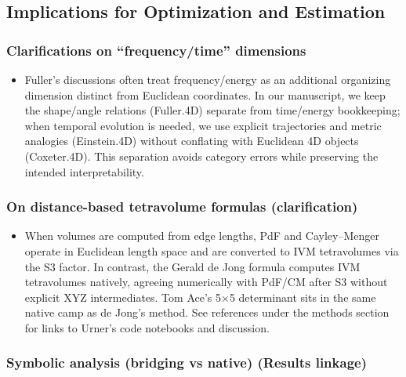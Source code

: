\documentclass[
  10pt,
]{article}
\providecommand{\tightlist}{%
  \setlength{\itemsep}{0pt}\setlength{\parskip}{0pt}}
\begin{document}
\hypertarget{implications-for-optimization-and-estimation}{%
\subsection{Implications for Optimization and
Estimation}\label{implications-for-optimization-and-estimation}}

\hypertarget{clarifications-on-frequencytime-dimensions}{%
\subsubsection{Clarifications on ``frequency/time''
dimensions}\label{clarifications-on-frequencytime-dimensions}}

\begin{itemize}
\tightlist
\item
  Fuller's discussions often treat frequency/energy as an additional
  organizing dimension distinct from Euclidean coordinates. In our
  manuscript, we keep the shape/angle relations (Fuller.4D) separate
  from time/energy bookkeeping; when temporal evolution is needed, we
  use explicit trajectories and metric analogies (Einstein.4D) without
  conflating with Euclidean 4D objects (Coxeter.4D). This separation
  avoids category errors while preserving the intended interpretability.
\end{itemize}

\hypertarget{on-distance-based-tetravolume-formulas-clarification}{%
\subsubsection{On distance-based tetravolume formulas
(clarification)}\label{on-distance-based-tetravolume-formulas-clarification}}

\begin{itemize}
\tightlist
\item
  When volumes are computed from edge lengths, PdF and Cayley--Menger
  operate in Euclidean length space and are converted to IVM
  tetravolumes via the S3 factor. In contrast, the Gerald de Jong
  formula computes IVM tetravolumes natively, agreeing numerically with
  PdF/CM after S3 without explicit XYZ intermediates. Tom Ace's 5×5
  determinant sits in the same native camp as de Jong's method. See
  references under the methods section for links to Urner's code
  notebooks and discussion.
\end{itemize}

\hypertarget{symbolic-analysis-bridging-vs-native-results-linkage}{%
\subsubsection{Symbolic analysis (bridging vs native) (Results
linkage)}\label{symbolic-analysis-bridging-vs-native-results-linkage}}
\end{document}
